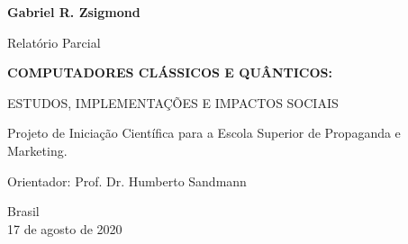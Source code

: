 \begin{titlepage}

    \begin{center}
        
        \textbf{Gabriel R. Zsigmond}
        
        \vspace{2cm}
        
        \Large
        Relatório Parcial
        \vspace{0.5cm}

        \LARGE
        \textbf{COMPUTADORES CLÁSSICOS E QUÂNTICOS:}
        
        \vspace{0.5cm}
        \large
        ESTUDOS, IMPLEMENTAÇÕES E IMPACTOS SOCIAIS
        
        
        \vspace{2cm}
        
        \large
        \begin{flushright}
            \begin{minipage}{10cm}
            Projeto de Iniciação Científica para a Escola Superior de Propaganda e Marketing.\linebreak[3]
            
            Orientador: Prof. Dr. Humberto Sandmann
            \end{minipage}
        \end{flushright}
        \vfill
        
        Brasil\\
        17 de agosto de 2020\\
        
    \end{center}

\end{titlepage}